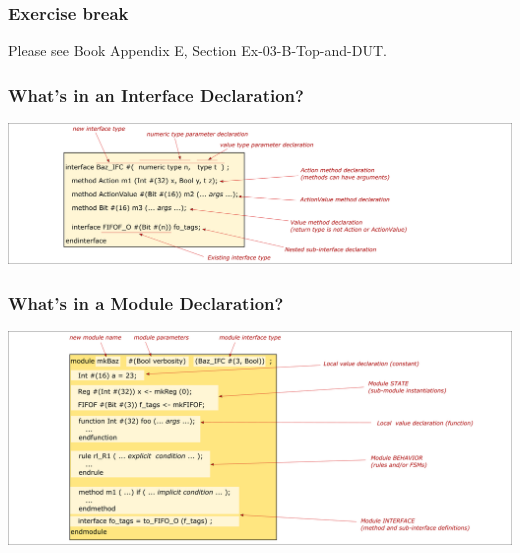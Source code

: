 
\begin{frame}
\frametitle{\EmojiExercise \hmm Exercise break}

Please see Book Appendix E, Section Ex-03-B-Top-and-DUT.

\end{frame}


\begin{frame}
\frametitle{What's in an Interface Declaration?}

\begin{center}
\includegraphics[width=\textwidth]{../Figures/Fig_BSV_whats_in_an_interface_decl}
\end{center}

\end{frame}


\begin{frame}
\frametitle{What's in a Module Declaration?}

\begin{center}
\includegraphics[width=\textwidth]{../Figures/Fig_BSV_whats_in_a_module_decl}
\end{center}

\end{frame}


